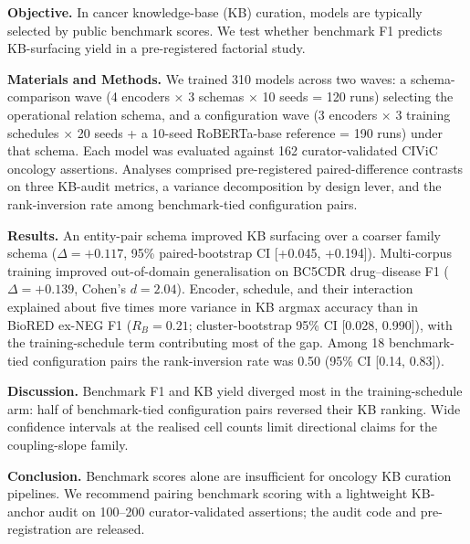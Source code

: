 
\noindent\textbf{Objective.}
In cancer knowledge-base (KB) curation, models are typically
selected by public benchmark scores. We test whether benchmark F1
predicts KB-surfacing yield in a pre-registered factorial study.

\noindent\textbf{Materials and Methods.}
We trained 310 models across two waves: a schema-comparison wave
(4 encoders \(\times\) 3 schemas \(\times\) 10 seeds = 120 runs)
selecting the operational relation schema, and a configuration
wave (3 encoders \(\times\) 3 training schedules \(\times\) 20
seeds + a 10-seed RoBERTa-base reference = 190 runs) under that
schema. Each model was evaluated against 162 curator-validated
CIViC oncology assertions. Analyses comprised
pre-registered paired-difference contrasts on three KB-audit
metrics, a variance decomposition by design lever, and the
rank-inversion rate among benchmark-tied configuration pairs.

\noindent\textbf{Results.}
An entity-pair schema improved KB surfacing over a coarser family
schema (\(\Delta=+0.117\), 95\% paired-bootstrap CI [+0.045, +0.194]).
Multi-corpus training improved out-of-domain generalisation on
BC5CDR drug--disease F1 (\(\Delta=+0.139\), Cohen's \(d=2.04\)).
Encoder, schedule, and their interaction explained about five
times more variance in KB argmax accuracy than in BioRED ex-NEG F1
(\(R_B=0.21\); cluster-bootstrap 95\% CI [0.028, 0.990]), with the
training-schedule term contributing most of the gap.
Among 18 benchmark-tied configuration pairs the rank-inversion rate
was 0.50 (95\% CI [0.14, 0.83]).

\noindent\textbf{Discussion.}
Benchmark F1 and KB yield diverged most in the training-schedule
arm: half of benchmark-tied configuration pairs reversed their KB
ranking. Wide confidence intervals at the realised cell counts
limit directional claims for the coupling-slope family.

\noindent\textbf{Conclusion.}
Benchmark scores alone are insufficient for oncology KB curation
pipelines. We recommend pairing benchmark scoring with a
lightweight KB-anchor audit on 100--200 curator-validated
assertions; the audit code and pre-registration are released.
